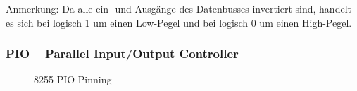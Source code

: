 Anmerkung: Da alle ein- und Ausgänge des Datenbusses invertiert sind, handelt es sich bei logisch 1 um einen Low-Pegel und bei logisch 0 um einen High-Pegel.

\subsubsection{PIO -- Parallel Input/Output Controller}
\begin{figure}[H]
    \qquad
    \qquad
    \caption[Z80 PIO Pinning]{8255 PIO Pinning \cite{z80:pio}}
    \label{fig:z80-pio-pinning}
\end{figure}

